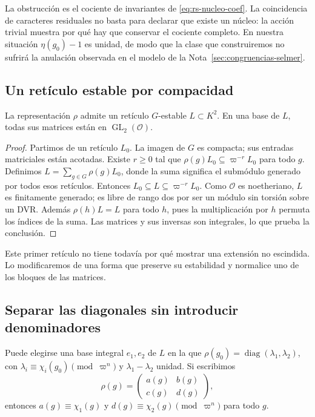 La obstrucción es el cociente de invariantes de
\eqref{eq:rs-nucleo-coef}. La coincidencia de caracteres residuales
no basta para declarar que existe un núcleo: la acción trivial
muestra por qué hay que conservar el cociente completo.
En nuestra situación $\eta(g_0)-1$ es unidad, de modo que la
clase que construiremos no sufrirá la anulación observada en
el modelo de la Nota~\ref{sec:congruencias-selmer}.

\subsection{Un retículo estable por compacidad}

\begin{lema}
\label{lem:rs-reticulo}
La representación $\rho$ admite un retículo $G$-estable
$L\subset K^2$. En una base de $L$, todas sus matrices están en
$\operatorname{GL}_2(\mathcal O)$.
\end{lema}

\begin{proof}
Partimos de un retículo $L_0$. La imagen de $G$ es compacta;
sus entradas matriciales están acotadas. Existe $r\ge0$ tal que
$\rho(g)L_0\subseteq\varpi^{-r}L_0$ para todo $g$. Definimos
$L=\sum_{g\in G}\rho(g)L_0$, donde la suma significa el submódulo
generado por todos esos retículos. Entonces
$L_0\subseteq L\subseteq\varpi^{-r}L_0$.
Como $\mathcal O$ es noetheriano, $L$ es finitamente generado;
es libre de rango dos por ser un módulo sin torsión sobre un DVR.
Además $\rho(h)L=L$ para todo $h$, pues la multiplicación por $h$
permuta los índices de la suma. Las matrices y sus inversas son
integrales, lo que prueba la conclusión.
\end{proof}

Este primer retículo no tiene todavía por qué mostrar una extensión
no escindida. Lo modificaremos de una forma que preserve su
estabilidad y normalice uno de los bloques de las matrices.

\subsection{Separar las diagonales sin introducir denominadores}

\begin{lema}
\label{lem:rs-separador}
Puede elegirse una base integral $e_1,e_2$ de $L$ en la que
$\rho(g_0)=\operatorname{diag}(\lambda_1,\lambda_2)$,
con $\lambda_i\equiv\chi_i(g_0)\pmod{\varpi^n}$ y
$\lambda_1-\lambda_2$ unidad. Si escribimos
\begin{equation}
 \rho(g)=\begin{pmatrix}a(g)&b(g)\\c(g)&d(g)\end{pmatrix},
 \label{eq:rs-bloques}
\end{equation}
entonces $a(g)\equiv\chi_1(g)$ y
$d(g)\equiv\chi_2(g)\pmod{\varpi^n}$ para todo $g$.
\end{lema}

